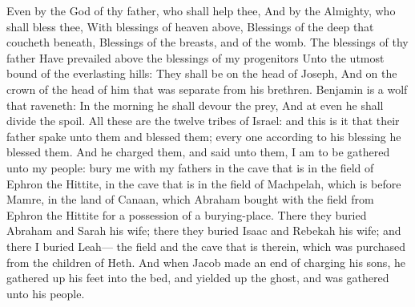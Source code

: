 Even by the God of thy father, who shall help thee, And by the Almighty, who shall bless thee, With blessings of heaven above, Blessings of the deep that coucheth beneath, Blessings of the breasts, and of the womb.  The blessings of thy father Have prevailed above the blessings of my progenitors Unto the utmost bound of the everlasting hills: They shall be on the head of Joseph, And on the crown of the head of him that was separate from his brethren.  Benjamin is a wolf that raveneth: In the morning he shall devour the prey, And at even he shall divide the spoil.  All these are the twelve tribes of Israel: and this is it that their father spake unto them and blessed them; every one according to his blessing he blessed them. And he charged them, and said unto them, I am to be gathered unto my people: bury me with my fathers in the cave that is in the field of Ephron the Hittite, in the cave that is in the field of Machpelah, which is before Mamre, in the land of Canaan, which Abraham bought with the field from Ephron the Hittite for a possession of a burying-place. There they buried Abraham and Sarah his wife; there they buried Isaac and Rebekah his wife; and there I buried Leah— the field and the cave that is therein, which was purchased from the children of Heth. And when Jacob made an end of charging his sons, he gathered up his feet into the bed, and yielded up the ghost, and was gathered unto his people. 

